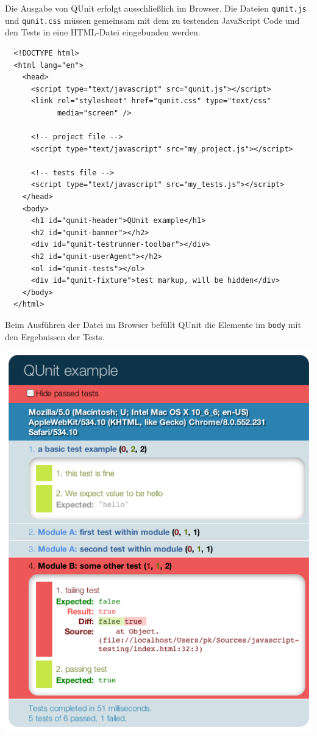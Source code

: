 \documentclass[11pt, a4paper]{article}
\begin{document}
Die Ausgabe von QUnit erfolgt ausschließlich im Browser. Die Dateien
\texttt{qunit.js} und \texttt{qunit.css} müssen gemeinsam mit dem zu testenden
JavaScript Code und den Tests in eine HTML-Datei eingebunden werden.

\begin{verbatim}
  <!DOCTYPE html>
  <html lang="en">
    <head>
      <script type="text/javascript" src="qunit.js"></script>
      <link rel="stylesheet" href="qunit.css" type="text/css"
            media="screen" />

      <!-- project file -->
      <script type="text/javascript" src="my_project.js"></script>

      <!-- tests file -->
      <script type="text/javascript" src="my_tests.js"></script>
    </head>
    <body>
      <h1 id="qunit-header">QUnit example</h1>
      <h2 id="qunit-banner"></h2>
      <div id="qunit-testrunner-toolbar"></div>
      <h2 id="qunit-userAgent"></h2>
      <ol id="qunit-tests"></ol>
      <div id="qunit-fixture">test markup, will be hidden</div>
    </body>
  </html>
\end{verbatim}

Beim Ausführen der Datei im Browser befüllt QUnit die Elemente im
\texttt{body} mit den Ergebnissen der Tests.

\begin{center}
  \includegraphics[width = 1\textwidth]{QUnit.png}
\end{center}
\end{document}
